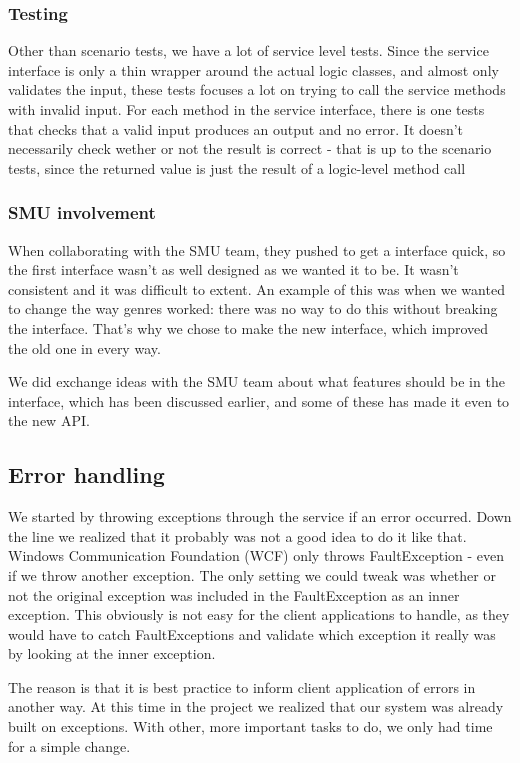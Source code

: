 \subsubsection{Testing}
Other than scenario tests, we have a lot of service level tests. Since the service interface is only a thin wrapper around the actual logic classes, and almost only validates the input, these tests focuses a lot on trying to call the service methods with invalid input. For each method in the service interface, there is one tests that checks that a valid input produces an output and no error. It doesn't necessarily check wether or not the result is correct - that is up to the scenario tests, since the returned value is just the result of a logic-level method call

\subsubsection{SMU involvement}
\label{Design_Service_Interface_SMU}
When collaborating with the SMU team, they pushed to get a interface quick, so the first interface wasn't as well designed as we wanted it to be. It wasn't consistent and it was difficult to extent. An example of this was when we wanted to change the way genres worked: there was no way to do this without breaking the interface. That's why we chose to make the new interface, which improved the old one in every way.

We did exchange ideas with the SMU team about what features should be in the interface, which has been discussed earlier, and some of these has made it even to the new API.

\subsection{Error handling}
\label{Implementation_Service_Error}

We started by throwing exceptions through the service if an error occurred. Down the line we realized that it probably was not a good idea to do it like that. Windows Communication Foundation (WCF) only throws FaultException - even if we throw another exception. The only setting we could tweak was whether or not the original exception was included in the FaultException as an inner exception. This obviously is not easy for the client applications to handle, as they would have to catch FaultExceptions and validate which exception it really was by looking at the inner exception.

The reason is that it is best practice to inform client application of errors in another way. At this time in the project we realized that our system was already built on exceptions. With other, more important tasks to do, we only had time for a simple change.

